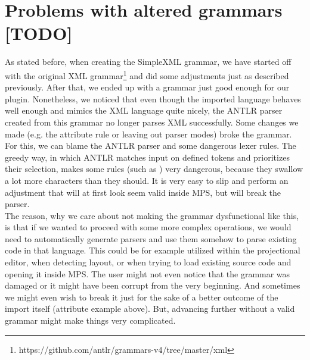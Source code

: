 \section{Problems with altered grammars [TODO]}
\label{chap:problems_with_alteration}

As stated before, when creating the SimpleXML grammar, we have started off with the original XML grammar\footnote{https://github.com/antlr/grammars-v4/tree/master/xml} and did some adjustments just as described previously.
After that, we ended up with a grammar just good enough for our plugin.
Nonetheless, we noticed that even though the imported language behaves well enough and mimics the XML language quite nicely, the ANTLR parser created from this grammar no longer parses XML successfully.
Some changes we made (e.g. the attribute rule or leaving out parser modes) broke the grammar.
\\

For this, we can blame the ANTLR parser and some dangerous lexer rules.
The greedy way, in which ANTLR matches input on defined tokens and prioritizes their selection, makes some rules (such as ) very dangerous, because they swallow a lot more characters than they should.
It is very easy to slip and perform an adjustment that will at first look seem valid inside MPS, but will break the parser.
\\

The reason, why we care about not making the grammar dysfunctional like this, is that if we wanted to proceed with some more complex operations, we would need to automatically generate parsers and use them somehow to parse existing code in that language.
This could be for example utilized within the projectional editor, when detecting layout, or when trying to load existing source code and opening it inside MPS. The user might not even notice that the grammar was damaged or it might have been corrupt from the very beginning. And sometimes we might even wish to break it just for the sake of a better outcome of the import itself (attribute example above). But, advancing further without a valid grammar might make things very complicated.
